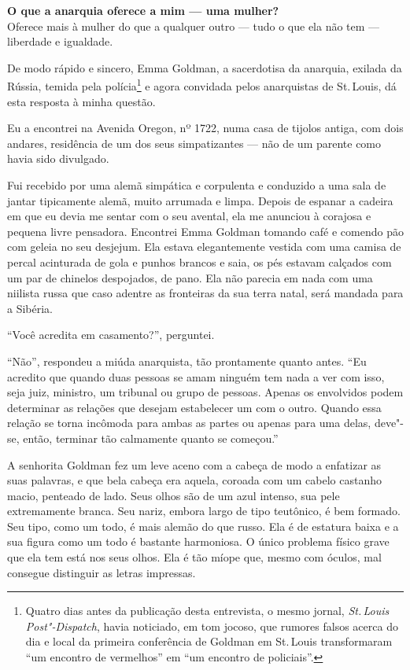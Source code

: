 \epigraph{\textbf{O que a anarquia oferece a mim --- uma mulher?}\\
Oferece mais à mulher do que a qualquer outro --- tudo o que ela não
tem --- liberdade e igualdade.}{}

\noindent{}De modo rápido e sincero, Emma Goldman, a sacerdotisa da anarquia,
exilada da Rússia, temida pela polícia\footnote{Quatro dias antes da publicação desta entrevista, o mesmo jornal, \textit{St.\,Louis Post"-Dispatch}, havia noticiado, em tom jocoso, que rumores falsos acerca do dia e local da primeira conferência de Goldman em St.\,Louis transformaram ``um encontro de vermelhos'' em ``um encontro de policiais''.} e agora convidada
pelos anarquistas de St.\,Louis, dá esta resposta à minha questão.

Eu a encontrei na Avenida Oregon, nº 1722, numa casa
de tijolos antiga, com dois andares, residência de um dos seus
simpatizantes --- não de um parente como havia sido divulgado.

Fui recebido por uma alemã simpática e corpulenta e conduzido a uma sala %
de jantar tipicamente alemã, muito arrumada e limpa. Depois de espanar a
cadeira em que eu devia me sentar com o seu avental, ela me anunciou à
corajosa e pequena livre pensadora. Encontrei Emma Goldman tomando café
e comendo pão com geleia no seu desjejum. Ela estava elegantemente
vestida com uma camisa de percal acinturada de gola e punhos brancos e
saia, os pés estavam calçados com um par de chinelos despojados, de
pano. Ela não parecia em nada com uma niilista russa que caso adentre as
fronteiras da sua terra natal, será mandada para a Sibéria.

``Você acredita em casamento?'', perguntei.

``Não'', respondeu a miúda anarquista, tão prontamente quanto antes.
``Eu acredito que quando duas pessoas se amam ninguém tem nada a ver com
isso, seja juiz, ministro, um tribunal ou grupo de pessoas.
Apenas os envolvidos podem determinar as relações que desejam estabelecer um com o
outro. Quando essa relação se torna incômoda para ambas as partes ou
apenas para uma delas, deve"-se, então, terminar tão calmamente quanto se
começou.''

A senhorita Goldman fez um leve aceno com a cabeça de modo a enfatizar
as suas palavras, e que bela cabeça era aquela, coroada com um cabelo
castanho macio, penteado de lado. Seus olhos são de um azul intenso,
sua pele extremamente branca. Seu nariz, embora largo de tipo
teutônico, é bem formado. Seu tipo, como um todo, é mais alemão do que
russo. Ela é de estatura baixa e a sua figura como um todo é bastante harmoniosa.
O único problema físico grave que ela tem está nos seus olhos. Ela é tão míope que,
mesmo com óculos, mal consegue distinguir as letras impressas.

